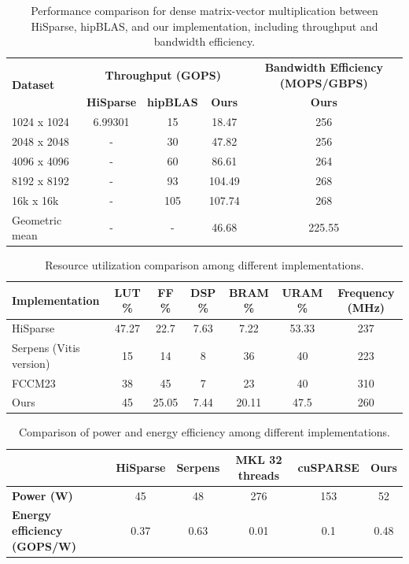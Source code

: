 \documentclass[manuscript,screen,review]{acmart}
\begin{document}
\begin{table}[h!]
	\centering
	\begin{tabular}{|l|c|c|c|c|}
		\hline
		\multirow{2}{*}{\textbf{Dataset}} & \multicolumn{3}{c|}{\textbf{Throughput (GOPS)}} & \textbf{Bandwidth Efficiency (MOPS/GBPS)} \\
		\cline{2-5}
		& \textbf{HiSparse} & \textbf{hipBLAS} & \textbf{Ours} & \textbf{Ours} \\
		\hline
		1024 x 1024 & 6.99301 & 15 & 18.47 & 256 \\
		2048 x 2048 & - & 30 & 47.82 & 256 \\
		4096 x 4096 & - & 60 & 86.61 & 264 \\
		8192 x 8192 & - & 93 & 104.49 & 268 \\
		16k x 16k & - & 105 & 107.74 & 268 \\
		\hline
		Geometric mean & - & - & 46.68 & 225.55 \\
		\hline
	\end{tabular}
	\caption{Performance comparison for dense matrix-vector multiplication between HiSparse, hipBLAS, and our implementation, including throughput and bandwidth efficiency.}
	\label{dense}
\end{table}

\begin{table}[h!]
	\centering
	\begin{tabular}{|l|c|c|c|c|c|c|}
		\hline
		\textbf{Implementation} & \textbf{LUT \%} & \textbf{FF \%} & \textbf{DSP \%} & \textbf{BRAM \%} & \textbf{URAM \%} & \textbf{Frequency (MHz)} \\
		\hline
		HiSparse & 47.27 & 22.7 & 7.63 & 7.22 & 53.33 & 237 \\
		Serpens (Vitis version) & 15 & 14 & 8 & 36 & 40 & 223 \\
		FCCM23 & 38 & 45 & 7 & 23 & 40 & 310 \\
		Ours & 45 & 25.05 & 7.44 & 20.11 & 47.5 & 260 \\
		\hline
	\end{tabular}
	\caption{Resource utilization comparison among different implementations.}
	\label{resource_util}
\end{table}

\begin{table}[h!]
	\centering
	\begin{tabular}{|l|c|c|c|c|c|}
		\hline
		\textbf{} & \textbf{HiSparse} & \textbf{Serpens} & \textbf{MKL 32 threads} & \textbf{cuSPARSE} & \textbf{Ours} \\
		\hline
		\textbf{Power (W)} & 45 & 48 & 276 & 153 & 52 \\
		\textbf{Energy efficiency (GOPS/W)} & 0.37 & 0.63 & 0.01 & 0.1 & 0.48 \\
		\hline
	\end{tabular}
	\caption{Comparison of power and energy efficiency among different implementations.}
	\label{power_energy_efficiency}
\end{table}
\end{document}
